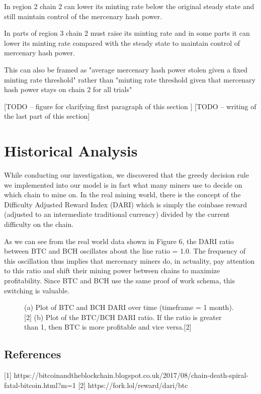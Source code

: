 \documentclass[10pt, preprint]{aastex}
\begin{document}
In region 2 chain 2 can lower its minting rate below the original steady state and still maintain control of the mercenary hash power.

In parts of region 3 chain 2 must raise its minting rate and in some parts it can lower its minting rate compared with the steady state to maintain control of mercenary hash power.

This can also be framed as "average mercenary hash power stolen given a fixed minting rate threshold" rather than "minting rate threshold given that mercenary hash power stays on chain 2 for all trials"

[TODO -- figure for clarifying first paragraph of this section ]
[TODO -- writing of the last part of this section]


\section{Historical Analysis}
While conducting our investigation, we discovered that the greedy decision rule we implemented into our model is in fact what many miners use to decide on which chain to mine on. In the real mining world, there is the concept of the Difficulty Adjusted Reward Index (DARI) which is simply the coinbase reward (adjusted to an intermediate traditional currency) divided by the current difficulty on the chain.

As we can see from the real world data shown in Figure 6, the DARI ratio between BTC and BCH oscillates about the line ratio = 1.0. The frequency of this oscillation thus implies that mercenary miners do, in actuality, pay attention to this ratio and shift their mining power between chains to maximize profitability. Since BTC and BCH use the same proof of work schema, this switching is valuable.

\begin{figure}
	\centering
	\qquad
	\caption{(a) Plot of BTC and BCH DARI over time (timeframe = 1 month).[2] (b) Plot of the BTC/BCH DARI ratio. If the ratio is greater than 1, then BTC is more profitable and vice versa.[2]}
\end{figure}



\subsection{References}
[1] https://bitcoinandtheblockchain.blogspot.co.uk/2017/08/chain-death-spiral-fatal-bitcoin.html?m=1
[2] https://fork.lol/reward/dari/btc
\end{document}
